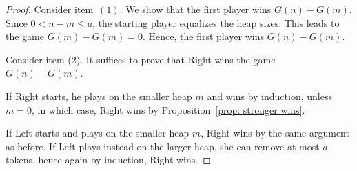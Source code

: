 \documentclass[oneside,reqno]{amsart}
\begin{document}
\begin{proof}
    Consider item~$(1)$. We show that the first player wins $G(n)-G(m)$. Since \(0< n - m \leq a\), the starting player equalizes the heap sizes. This leads to the game $G(m)-G(m) =0$. Hence, the first player wins \( G(n) - G(m) \).

    Consider item (2). It suffices to prove that Right wins the game $G(n) - G(m)$. %

    If Right starts, he plays on the smaller heap $m$ and wins by induction, unless $m=0$, in which case, Right wins by Proposition~\ref{prop: stronger wins}.

    If Left starts and plays on the smaller heap $m$, Right wins by the same argument as before. If Left plays instead on the larger heap, she can remove at most $a$ tokens, hence again by induction, Right wins.  
\end{proof}



    

    
    
\end{document}
